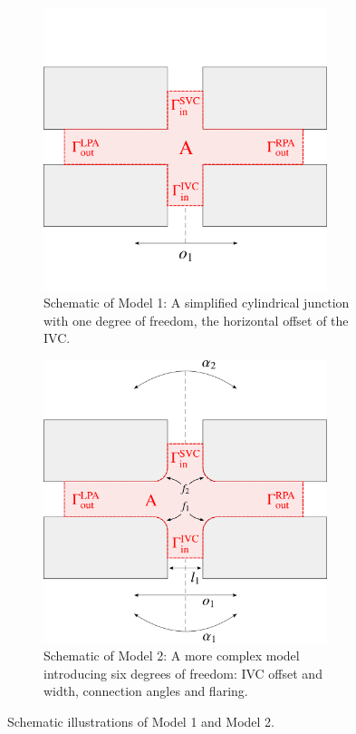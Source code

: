 \begin{figure}[H]
	\begin{subfigure}{0.48\textwidth}
		\centering
		\includegraphics[width=0.91\textwidth, trim={0 0 0 0}]{figures/model1.pdf}
		\caption[Simplified Cylindrical Junction]{Schematic of Model 1: A simplified cylindrical junction with one degree of freedom, the horizontal offset of the IVC.}
		\label{fig:model1_schematic}
	\end{subfigure}\hfill%
	\begin{subfigure}{0.48\textwidth}
		\centering
		\includegraphics[width=0.91\textwidth]{figures/model2.pdf}
		\caption[Complex Geometric Model]{Schematic of Model 2: A more complex model introducing six degrees of freedom: IVC offset and width, connection angles and flaring.}
		\label{fig:model2_schematic}
	\end{subfigure}
	\vspace{4mm}
	\caption{Schematic illustrations of Model 1 and Model 2.}
	\label{fig:model schemas}
\end{figure}